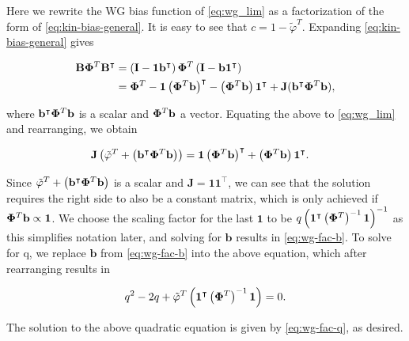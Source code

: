 \documentclass[11pt]{article}
\newcommand{\kinMat}[1][T]{%
  \ensuremath{%
    \mathbf{\Phi}^{#1}
  }%
  \xspace%
}%
\begin{document}
\begin{linenumbers}
\begin{appendices}
  Here we rewrite the WG bias function of \cref{eq:wg_lim} as a factorization of the form of \cref{eq:kin-bias-general}.
  It is easy to see that $c = 1 - \tilde{\varphi}^T$.
  Expanding \cref{eq:kin-bias-general} gives
  \begin{linenomath*}
  \begin{align*}
    \mathbf{B} \kinMat \mathbf{B}^\intercal
    &= \left( \mathbf{I} - \mathbf{1} \mathbf{b}^\intercal \right) \kinMat \left( \mathbf{I} - \mathbf{b} \mathbf{1}^\intercal \right)
    \\
    &= \kinMat - \mathbf{1} \left( \kinMat \mathbf{b} \right)^\intercal - \left( \kinMat \mathbf{b} \right) \mathbf{1}^\intercal + \mathbf{J}(\mathbf{b}^\intercal \kinMat \mathbf{b} ),
  \end{align*} 
  \end{linenomath*}
  where $\mathbf{b}^\intercal \kinMat \mathbf{b}$ is a scalar and $\kinMat\mathbf{b}$ a vector.
  Equating the above to \cref{eq:wg_lim} and rearranging, we obtain
  \begin{linenomath*}
  \begin{align*}
    \mathbf{J} \left( \tilde{\varphi}^T + \left( \mathbf{b}^\intercal \kinMat \mathbf{b} \right) \right)
    &= \mathbf{1} \left( \kinMat \mathbf{b} \right)^\intercal + \left( \kinMat\mathbf{b} \right) \mathbf{1}^\intercal .
  \end{align*}
  \end{linenomath*}
  Since $\tilde{\varphi}^T + \left( \mathbf{b}^\intercal \kinMat \mathbf{b} \right)$ is a scalar and $\mathbf{J} = \mathbf{1} \mathbf{1}^\intercal$, we can see that the solution requires the right side to also be a constant matrix, which is only achieved if $\kinMat\mathbf{b} \propto \mathbf{1}$.
  We choose the scaling factor for the last $\mathbf{1}$ to be $q \left( \mathbf{1}^\intercal \left( \kinMat \right)^{-1} \mathbf{1} \right)^{-1}$ as this simplifies notation later, and solving for $\mathbf{b}$ results in \cref{eq:wg-fac-b}.
  To solve for q, we replace $\mathbf{b}$ from \cref{eq:wg-fac-b} into the above equation, which after rearranging results in
  \begin{linenomath*}
  \begin{align*}
    q^2 - 2q + \tilde{\varphi}^T \left( \mathbf{1}^\intercal \left( \kinMat \right)^{-1} \mathbf{1} \right) = 0.
  \end{align*}
  \end{linenomath*}
  The solution to the above quadratic equation is given by \cref{eq:wg-fac-q}, as desired.


\end{appendices}
\end{linenumbers}
\end{document}
